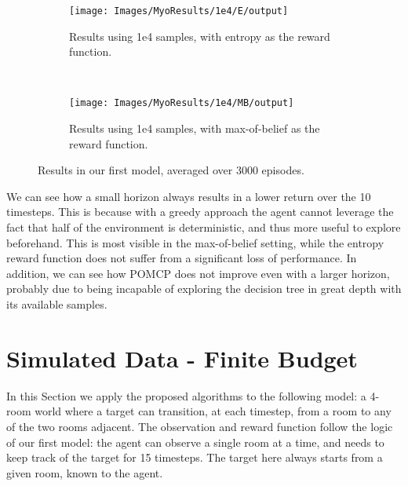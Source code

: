 \begin{figure}[ht!]
        \centering
        \begin{subfigure}[t]{0.45\textwidth}
                \texttt{[image: Images/MyoResults/1e4/E/output]}
                \caption{Results using 1e4 samples, with entropy as the reward function.}
                \label{fig:m4e}
        \end{subfigure}%
        ~ %
        \begin{subfigure}[t]{0.45\textwidth}
                \texttt{[image: Images/MyoResults/1e4/MB/output]}
                \caption{Results using 1e4 samples, with max-of-belief as the reward function.}
                \label{fig:m5e}
        \end{subfigure}
        \caption{Results in our first model, averaged over 3000 episodes.}
        \label{ref:myoentropyfig}
\end{figure}
%

We can see how a small horizon always results in a lower return over the 10 timesteps. This is
because with a greedy approach the agent cannot leverage the fact that half of the environment is
deterministic, and thus more useful to explore beforehand. This is most visible in the max-of-belief
setting, while the entropy reward function does not suffer from a significant loss of performance.
In addition, we can see how POMCP does not improve even with a larger horizon, probably due to being
incapable of exploring the decision tree in great depth with its available samples.

\section{Simulated Data - Finite Budget}

In this Section we apply the proposed algorithms to the following model: a 4-room world where a
target can transition, at each timestep, from a room to any of the two rooms adjacent. The
observation and reward function follow the logic of our first model: the agent can observe a single
room at a time, and needs to keep track of the target for 15 timesteps. The target here always
starts from a given room, known to the agent.

